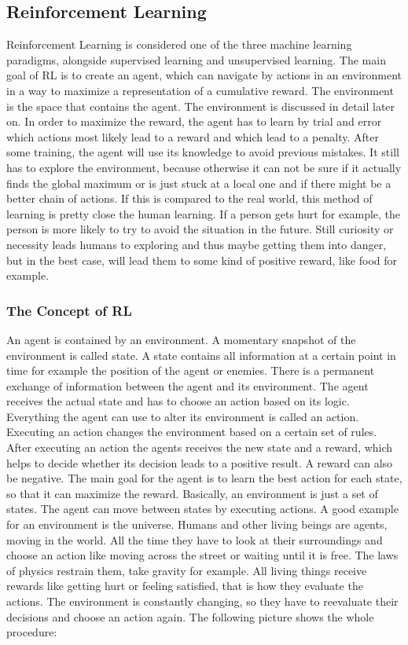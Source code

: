 \subsection{Reinforcement Learning}
	Reinforcement Learning is considered one of the three machine learning paradigms, alongside supervised learning and unsupervised learning.
	The main goal of RL is to create an agent, which can navigate by actions in an environment in a way to maximize a representation of a cumulative reward.
	The environment is the space that contains the agent. 
	The environment is discussed in detail later on.
	In order to maximize the reward, the agent has to learn by trial and error which actions most likely lead to a reward and which lead to a penalty.
	After some training, the agent will use its knowledge to avoid previous mistakes.
	It still has to explore the environment, because otherwise it can not be sure if it actually finds the global maximum or is just stuck at a local one and if there might be a better chain of actions.
	If this is compared to the real world, this method of learning is pretty close the human learning. 
	If a person gets hurt for example, the person is more likely to try to avoid the situation in the future.
	Still curiosity or necessity leads humans to exploring and thus maybe getting them into danger, but in the best case, will lead them to some kind of positive reward, like food for example.
	
	\subsubsection{The Concept of RL}
		An agent is contained by an environment.
		A momentary snapshot of the environment is called state.
		A state contains all information at a certain point in time for example the position of the agent or enemies.
		There is a permanent exchange of information between the agent and its environment.
		The agent receives the actual state and has to choose an action based on its logic. Everything the agent can use to alter its environment is called an action.
		Executing an action changes the environment based on a certain set of rules.
		After executing an action the agents receives the new state and a reward, which helps to decide whether its decision leads to a positive result.
		A reward can also be negative.
		The main goal for the agent is to learn the best action for each state, so that it can maximize the reward.
		Basically, an environment is just a set of states.
		The agent can move between states by executing actions.
		A good example for an environment is the universe.
		Humans and other living beings are agents, moving in the world.
		All the time they have to look at their surroundings and choose an action like moving across the street or waiting until it is free.
		The laws of physics restrain them, take gravity for example.
		All living things receive rewards like getting hurt or feeling satisfied, that is how they evaluate the actions.
		The environment is constantly changing, so they have to reevaluate their decisions and choose an action again. 
		The following picture shows the whole procedure:\\ 

